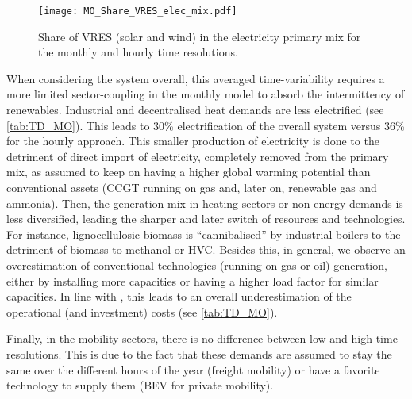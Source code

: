  \begin{figure}[!htbp]
\centering
\texttt{[image: MO\_Share\_VRES\_elec\_mix.pdf]}
\caption{Share of \gls{VRES} (\ie solar and wind) in the electricity primary mix for the monthly and hourly time resolutions.}
\label{fig:MO_Share_VRES_elec_mix}
\end{figure}

When considering the system overall, this averaged time-variability requires a more limited sector-coupling in the monthly model to absorb the intermittency of renewables. Industrial and decentralised heat demands are less electrified (see \autoref{tab:TD_MO}). This leads to 30\% electrification of the overall system versus 36\% for the hourly approach. This smaller production of electricity is done to the detriment of direct import of electricity, completely removed from the primary mix, as assumed to keep on having a higher global warming potential than conventional assets (\eg \gls{CCGT} running on gas and, later on, renewable gas and ammonia). Then, the generation mix in heating sectors or non-energy demands is less diversified, leading the sharper and later switch of resources and technologies. For instance, lignocellulosic biomass is ``cannibalised'' by industrial boilers to the detriment of biomass-to-methanol or \gls{HVC}. Besides this, in general, we observe an overestimation of conventional technologies (\eg running on gas or oil) generation, either by installing more capacities or having a higher load factor for similar capacities. In line with \citet{Poncelet2016}, this leads to an overall underestimation of the operational (and investment) costs (see \autoref{tab:TD_MO}).

Finally, in the mobility sectors, there is no difference between low and high time resolutions. This is due to the fact that these demands are assumed to stay the same over the different hours of the year (\ie freight mobility) or have a favorite technology to supply them (\eg \gls{BEV} for private mobility).


